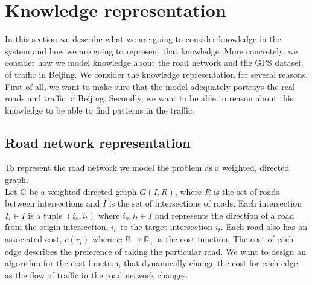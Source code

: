 \section{Knowledge representation}
In this section we describe what we are going to consider knowledge in the system and how we are going to represent that knowledge. More concretely, we consider how we model knowledge about the road network and the GPS dataset of traffic in Beijing. We consider the knowledge representation for several reasons. First of all, we want to make sure that the model adequately portrays the real roads and traffic of Beijing. Secondly, we want to be able to reason about this knowledge to be able to find patterns in the traffic.
\subsection{Road network representation}
To represent the road network we model the problem as a weighted, directed graph. \\
Let G be a weighted directed graph $G(I,R)$, where $R$ is the set of roads between intersections and $I$ is the set of intersections of roads. Each intersection $I_i \in I$ is a tuple $(i_o, i_t)$ where $i_o, i_t \in I$ and represents the direction of a road from the origin intersection, $i_o$ to the target intersection $i_t$. Each road also has an associated cost, $c(r_i)$ where  $c: R \rightarrow \mathbb R_+$ is the cost function. The cost of each edge describes the preference of taking the particular road. 
We want to design an algorithm for the cost function, that dynamically change the cost for each edge, as the flow of traffic in the road network changes.


